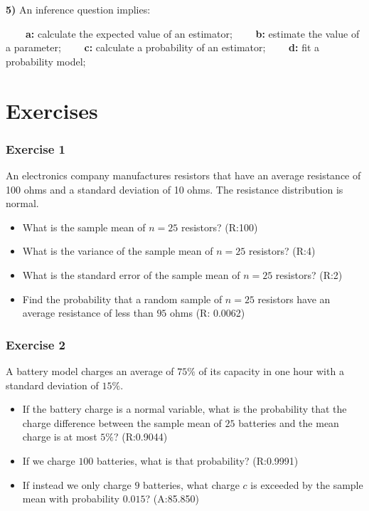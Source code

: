 \documentclass[
]{book}
\begin{document}
\textbf{5)} An inference question implies:

\textbf{\(\qquad\)a:} calculate the expected value of an estimator;
\textbf{\(\qquad\)b:} estimate the value of a parameter;
\textbf{\(\qquad\)c:} calculate a probability of an estimator;
\textbf{\(\qquad\)d:} fit a probability model;

\hypertarget{exercises-8}{%
\section{Exercises}\label{exercises-8}}

\hypertarget{exercise-1-7}{%
\subsubsection{Exercise 1}\label{exercise-1-7}}

An electronics company manufactures resistors that have an average resistance of 100 ohms and
a standard deviation of 10 ohms. The resistance distribution is normal.

\begin{itemize}
\item
  What is the sample mean of \(n=25\) resistors? (R:100)
\item
  What is the variance of the sample mean of \(n=25\) resistors? (R:4)
\item
  What is the standard error of the sample mean of \(n=25\) resistors? (R:2)
\item
  Find the probability
  that a random sample of \(n = 25\) resistors have an average resistance of less than \(95\) ohms (R: 0.0062)
\end{itemize}

\hypertarget{exercise-2-7}{%
\subsubsection{Exercise 2}\label{exercise-2-7}}

A battery model charges an average of \(75\%\) of its capacity in one hour with a standard deviation of \(15\%\).

\begin{itemize}
\item
  If the battery charge is a normal variable, what is the probability that the charge difference between the sample mean of \(25\) batteries and the mean charge is at most \(5\%\)? (R:0.9044)
\item
  If we charge \(100\) batteries, what is that probability? (R:0.9991)
\item
  If instead we only charge \(9\) batteries, what charge \(c\) is exceeded by the sample mean with probability \(0.015\)? (A:85.850)
\end{itemize}
\end{document}
